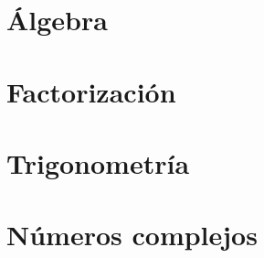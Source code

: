 \documentclass[
]{tufte-book}
\begin{document}
\chapter{Álgebra}








\chapter{Factorización}







\chapter{Trigonometría}



\chapter{Números complejos}


%
{}

\end{document}
